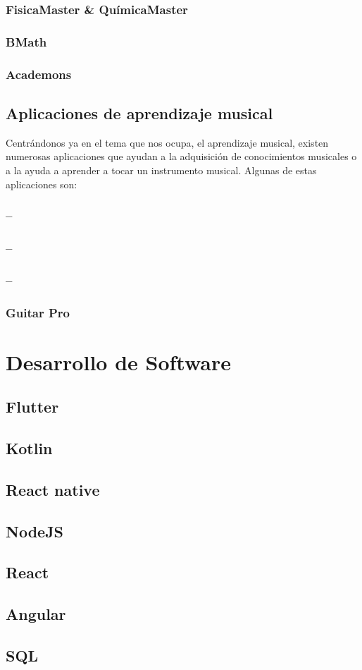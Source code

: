     \subsubsection{FisicaMaster \& QuímicaMaster}

    \subsubsection{BMath}


    \subsubsection{Academons}

    \subsection{Aplicaciones de aprendizaje musical}
    Centrándonos ya en el tema que nos ocupa, el aprendizaje musical, existen numerosas aplicaciones que ayudan a la adquisición
    de conocimientos musicales o a la ayuda a aprender a tocar un instrumento musical. Algunas de estas aplicaciones son:

    \subsubsection{--}
    \subsubsection{--}
    \subsubsection{--}

    \subsubsection{Guitar Pro}

  



    \section{Desarrollo de Software}
\subsection{Flutter}
\subsection{Kotlin}
\subsection{React native}
\subsection{NodeJS}

\subsection{React}
\subsection{Angular}
\subsection{SQL}